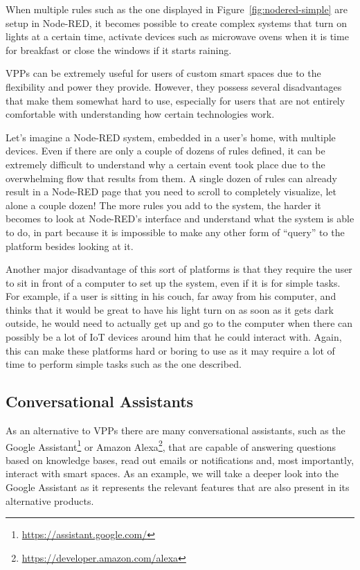 \documentclass[runningheads]{llncs}
\begin{document}
When multiple rules such as the one displayed in Figure~\ref{fig:nodered-simple} are setup in Node-RED, it becomes possible to create complex systems that turn on lights at a certain time, activate devices such as microwave ovens when it is time for breakfast or close the windows if it starts raining.

VPPs can be extremely useful for users of custom smart spaces due to the flexibility and power they provide. However, they possess several disadvantages that make them somewhat hard to use, especially for users that are not entirely comfortable with understanding how certain technologies work.

Let's imagine a Node-RED system, embedded in a user’s home, with multiple devices. Even if there are only a couple of dozens of rules defined, it can be extremely difficult to understand why a certain event took place due to the overwhelming flow that results from them. A single dozen of rules can already result in a Node-RED page that you need to scroll to completely visualize, let alone a couple dozen! The more rules you add to the system, the harder it becomes to look at Node-RED’s interface and understand what the system is able to do, in part because it is impossible to make any other form of  “query” to the platform besides looking at it.

Another major disadvantage of this sort of platforms is that they require the user to sit in front of a computer to set up the system, even if it is for simple tasks. For example, if a user is sitting in his couch, far away from his computer, and thinks that it would be great to have his light turn on as soon as it gets dark outside, he would need to actually get up and go to the computer when there can possibly be a lot of IoT devices around him that he could interact with. Again, this can make these platforms hard or boring to use as it may require a lot of time to perform simple tasks such as the one described.

\subsection{Conversational Assistants}

As an alternative to VPPs there are many conversational assistants, such as the Google Assistant\footnote{\url{https://assistant.google.com/}} or Amazon Alexa\footnote{\url{https://developer.amazon.com/alexa}}, that are capable of answering questions based on knowledge bases, read out emails or notifications and, most importantly, interact with smart spaces. As an example, we will take a deeper look into the Google Assistant as it represents the relevant features that are also present in its alternative products.
\end{document}
